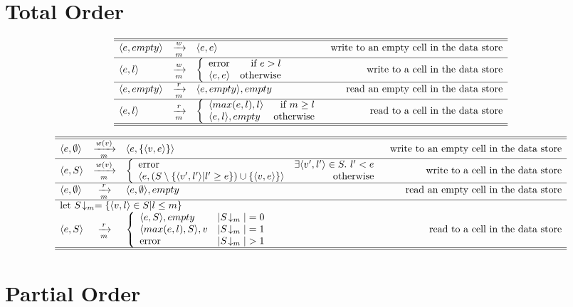 \section{Total Order}

\begin{table}
\[
\begin{array}{lclr}
\hline\hline
\langle e,empty \rangle & \xrightarrow[m]{w} & \langle e,e \rangle & \mbox{write to an empty cell in the data store}\\
\hline
\langle e,l \rangle & \xrightarrow[m]{w} & \left \{ \begin{array}{lr} \mbox{error} & \mbox{if} ~ e > l \\ \langle e,e \rangle & \mbox{otherwise} \end{array} \right. & \mbox{write to a cell in the data store}\\
\hline
\langle e,empty \rangle & \xrightarrow[m]{r} & \langle e,empty \rangle, empty & \mbox{read an empty cell in the data store}\\
\hline
\langle e,l \rangle & \xrightarrow[m]{r} & \left \{ \begin{array}{lr} \langle max(e,l),l \rangle & \mbox{if} ~ m \geq l \\ \langle e,l \rangle, empty & \mbox{otherwise} \end{array} \right. & \mbox{read to a cell in the data store}\\
\hline\hline
\end{array}
\]
\caption{\label{ta:ifc-total}%
Small-step operational semantics for enforcing IFC with a total order over the security labels. $m$ is a paramater of the program execution s.t. m is the maximal security label allowed for the execution.}
\end{table}

\begin{table}
\[
\begin{array}{lclr}
\hline\hline
\semrule{\tuple{e,\emptyset}}{w(v)}{\tuple{e,\{\tuple{v,e}\}}}{\mbox{write to an empty cell in the data store}}\\
\hline
\semrule{\tuple{e,S}}
        {w(v)}
        {\case{\mbox{error}}
              {\exists \tuple{v',l'} \in S. ~ l' < e}
              {\tuple{e,(S \setminus \{\tuple{v',l'} | l' \geq e \}) \cup \{\tuple{v,e}\}}}
              {\mbox{otherwise}}}
        {\mbox{write to a cell in the data store}}\\
\hline
\semrule{\tuple{e,\emptyset}} {r} {\tuple{e,\emptyset}, empty} {\mbox{read an empty cell in the data store}}\\
\hline
\multicolumn{4} {l} {\mbox{let}~ S\!\downarrow_m = \{\tuple{v,l}\in S | l \leq m\} }\\
\semrule{\tuple{e,S}}
        {r}
        {\casethree{\tuple{e,S}, empty} {|S\!\downarrow_m| = 0}
                   {\tuple{max(e,l), S}, v} {|S\!\downarrow_m| = 1}
                   {\mbox{error}}{|S\!\downarrow_m| > 1}} 
        {\mbox{read to a cell in the data store}}\\
\hline\hline
\end{array}
\]
\caption{\label{ta:ifc-partial}%
Small-step operational semantics for enforcing IFC with a partial order over the security labels. $m$ is a paramater of the program execution s.t. m is the maximal security label allowed for the execution.}
\end{table}


\section{Partial Order}

